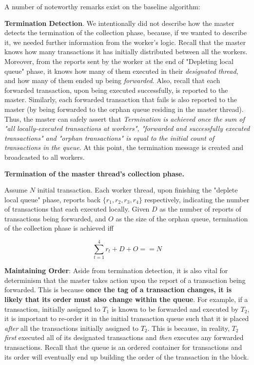 A number of noteworthy remarks exist on the baseline algorithm:

\textbf{Termination Detection}. We intentionally did not describe how the master detects the
termination of the collection phase, because, if we wanted to describe it, we needed further
information from the worker's logic. Recall that the master knows how many transactions it has
initially distributed between all the workers. Moreover, from the reports sent by the worker at the
end of "Depleting local queue" phase, it knows how many of them executed in their \textit{designated
thread}, and how many of them ended up being \textit{forwarded}. Also, recall that each forwarded
transaction, upon being executed successfully, is reported to the master. Similarly, each forwarded
transaction that fails is also reported to the master (by being forwarded to the orphan queue
residing in the master thread). Thus, the master can safely assert that \textit{Termination is
achieved once the sum of "all locally-executed transactions at workers", "forwarded and successfully
executed transactions" and "orphan transactions" is equal to the initial count of transactions in
the queue}. At this point, the termination message is created and broadcasted to all workers.

\begin{definition}
    \textbf{Termination of the master thread's collection phase. }

    Assume $N$ initial transaction. Each worker thread, upon finishing the "deplete local queue"
    phase, reports back $\{ r_{1}, r_{2}, r_{3}, r_{4} \}$ respectively, indicating the number of
    transactions that each executed locally. Given $D$ as the number of reports of transactions
    being forwarded, and $O$ as the size of the orphan queue, termination of the collection phase is
    achieved iff

    \begin{equation}
        \sum_{t = 1}^{4} r_{t} + D + O == N
    \end{equation}
\end{definition}


\textbf{Maintaining Order}: Aside from termination detection, it is also vital for determinism that
the master takes action upon the report of a transaction being forwarded. This is because
\textbf{once the tag of a transaction changes, it is likely that its order must also change within
the queue}. For example, if a transaction, initially assigned to $T_{1}$ is known to be forwarded
and executed by $T_{2}$, it is important to re-order it in the initial transaction queue such that
it is placed \textit{after} all the transactions initially assigned to $T_{2}$. This is because, in
reality, $T_{2}$ \textit{first} executed all of its designated transactions and \textit{then}
executes any forwarded transactions. Recall that the queue is an ordered container for transactions
and its order will eventually end up building the order of the transaction in the block.

